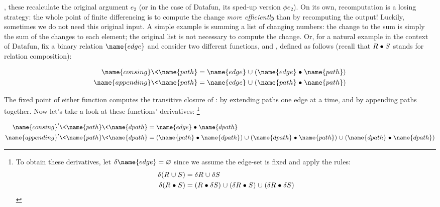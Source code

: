 \noindent
{}, these recalculate the original argument $e_2$ (or in the case of Datafun, its sped-up version $\phi e_2$).
%
%
On its own, recomputation is a losing strategy: the whole point of finite
differencing is to compute the change \emph{more efficiently} than by
recomputing the output!
%
Luckily, sometimes we do not need this original input.
%
A simple example is summing a list of changing numbers: the change to the sum is simply the sum of the changes to each element; the original list is not necessary to compute the change.
%
Or, for a natural example in the context of Datafun, fix a binary relation $\name{edge}$ and consider two different functions,  and , defined as follows (recall that $R \mathrel{\bullet} S$ stands for relation composition):

\begin{align*}
  \name{consing} \<\name{path}
  &= \name{edge} \cup (\name{edge} \relcomp \name{path})
  \\
  \name{appending} \<\name{path}
  &= \name{edge} \cup (\name{path} \relcomp \name{path})
\end{align*}

\noindent
The fixed point of either function computes the transitive closure of
:  by extending paths one edge at a time, and
 by appending paths together. Now let's take a look at these
functions' derivatives:%
%
\footnote{To obtain these derivatives, let $\delta \name{edge} = \varnothing$
  since we assume the edge-set is fixed and apply the rules:
  \begin{align*}
  \delta(R \cup S) &= \delta R \cup \delta S
  \\
  \delta(R \relcomp S) &=
  (R \relcomp \delta S) \cup (\delta R \relcomp S) \cup (\delta R \relcomp \delta S)
  \end{align*}}

\begin{align*}
  \name{consing}' \<\name{path} \<\name{dpath}
  &= \name{edge} \relcomp \name{dpath}
  \\
  \name{appending}' \<\name{path} \<\name{dpath}
  &= (\name{path} \relcomp \name{dpath})
  \cup (\name{dpath} \relcomp \name{path})
  \cup (\name{dpath} \relcomp \name{dpath})
\end{align*}


